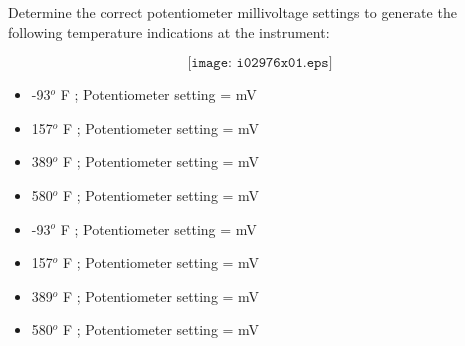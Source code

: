 

Determine the correct potentiometer millivoltage settings to generate the following temperature indications at the instrument:

$$\texttt{[image: i02976x01.eps]}$$

\begin{itemize}
\item{} -93$^{o}$ F ; Potentiometer setting = \underbar{\hskip 50pt} mV 
\vskip 5pt
\item{} 157$^{o}$ F ; Potentiometer setting = \underbar{\hskip 50pt} mV 
\vskip 5pt
\item{} 389$^{o}$ F ; Potentiometer setting = \underbar{\hskip 50pt} mV  
\vskip 5pt
\item{} 580$^{o}$ F ; Potentiometer setting = \underbar{\hskip 50pt} mV  
\end{itemize}







\begin{itemize}
\item{} -93$^{o}$ F ; Potentiometer setting =  mV 
\item{} 157$^{o}$ F ; Potentiometer setting =  mV 
\item{} 389$^{o}$ F ; Potentiometer setting =  mV  
\item{} 580$^{o}$ F ; Potentiometer setting =  mV  
\end{itemize}











